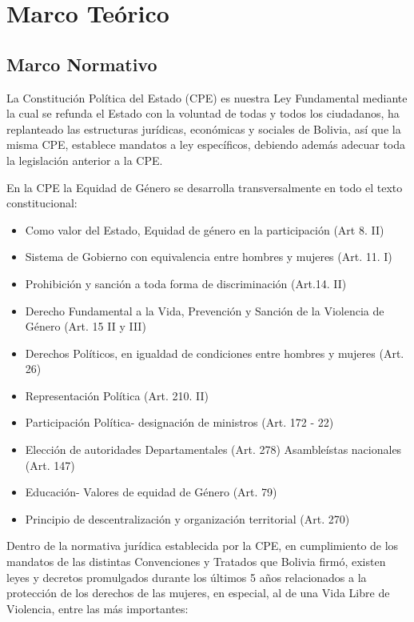 \section{Marco Teórico}

\subsection{Marco Normativo}
La Constitución Política del Estado (CPE) es nuestra Ley Fundamental mediante la cual se refunda el Estado con la voluntad de todas y todos los ciudadanos, ha replanteado las estructuras jurídicas, económicas y sociales de Bolivia, así que la misma CPE, establece mandatos a ley
específicos, debiendo además adecuar toda la legislación
anterior a la CPE.

En la CPE la Equidad de Género se desarrolla transversalmente en todo el texto constitucional:
\begin{itemize}
\item Como valor del Estado, Equidad de género en la participación (Art 8. II)
\item Sistema de Gobierno con equivalencia entre hombres y mujeres (Art. 11. I)
\item Prohibición y sanción a toda forma de discriminación (Art.14. II)
\item Derecho Fundamental a la Vida, Prevención y Sanción de la Violencia de Género (Art. 15 II y III)
\item Derechos Políticos, en igualdad de condiciones entre hombres y mujeres (Art. 26)
\item Representación Política (Art. 210. II)
\item Participación Política- designación de ministros (Art. 172 - 22)
\item Elección de autoridades Departamentales (Art. 278) Asambleístas nacionales (Art. 147)
\item Educación- Valores de equidad de Género (Art. 79)
\item Principio de descentralización y organización territorial (Art. 270)
\end{itemize}
 
Dentro de la normativa jurídica establecida por la CPE, en cumplimiento de los mandatos de las distintas Convenciones y Tratados que Bolivia firmó, existen leyes y decretos promulgados durante los últimos 5 años relacionados a la protección de los derechos de las mujeres, en especial, al de una Vida Libre de Violencia, entre las más importantes:


